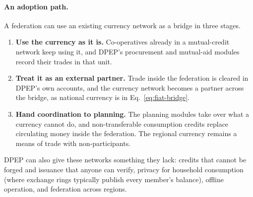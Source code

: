 \documentclass[10pt,twoside,openany]{book}
\theoremstyle{dpepstyle}
\begin{document}
\paragraph{An adoption path.} A federation can use an existing currency network as a bridge in three stages.
\begin{enumerate}[leftmargin=1.8em,itemsep=2pt]
  \item \textbf{Use the currency as it is.} Co-operatives already in a mutual-credit network keep using it, and DPEP's procurement and mutual-aid modules record their trades in that unit.
  \item \textbf{Treat it as an external partner.} Trade inside the federation is cleared in DPEP's own accounts, and the currency network becomes a partner across the bridge, as national currency is in Eq.~\ref{eq:fiat-bridge}.
  \item \textbf{Hand coordination to planning.} The planning modules take over what a currency cannot do, and non-transferable consumption credits replace circulating money inside the federation. The regional currency remains a means of trade with non-participants.
\end{enumerate}
DPEP can also give these networks something they lack: credits that cannot be forged and issuance that anyone can verify, privacy for household consumption (where exchange rings typically publish every member's balance), offline operation, and federation across regions.
\end{document}
